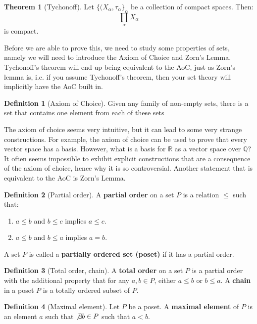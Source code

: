 \documentclass[11pt, oneside]{amsart}   	%
\theoremstyle{definition}
\newtheorem{definition}{Definition}[section]
\newtheorem{theorem}{Theorem}[section]
\begin{document}
	\begin{theorem}[Tychonoff]
		Let $\{(X_\alpha, \tau_\alpha\}_\alpha$ be a collection of compact spaces. Then:
		$$
			\prod_\alpha X_\alpha
		$$
		is compact.
	\end{theorem}
	
	Before we are able to prove this, we need to study some properties of sets, namely we will need to introduce the 
	Axiom of Choice and Zorn's Lemma. Tychonoff's theorem will end up being equivalent to the AoC, just as Zorn's 
	lemma is, i.e. if you assume Tychonoff's theorem, then your set theory will implicitly have the AoC built in. 
	
	\begin{definition}[Axiom of Choice]
		Given any family of non-empty sets, there is a set that contains one element from each of these sets
	\end{definition}
	
	The axiom of choice seems very intuitive, but it can lead to some very strange constructions. For example, the axiom 
	of choice can be used to prove that every vector space has a basis. However, what is a basis for $\mathbb R$ as a 
	vector space over $\mathbb Q$? It often seems impossible to exhibit explicit constructions that are a consequence 
	of the axiom of choice, hence why it is so controversial. Another statement that is equivalent to the AoC is 
	Zorn's Lemma.
	
	\begin{definition}[Partial order]
		A \textbf{partial order} on a set $P$ is a relation $\leq$ such that:
		\begin{enumerate}
			\item $a\leq b$ and $b\leq c$ implies $a\leq c$.
			\item $a\leq b$ and $b\leq a$ implies $a = b$.
		\end{enumerate}
		A set $P$ is called a \textbf{partially ordered set (poset)} if it has a partial order.
	\end{definition}
	
	\begin{definition}[Total order, chain]
		A \textbf{total order} on a set $P$ is a partial order with the additional property that for any $a, b\in P$, either 
		$a\leq b$ or $b\leq a$. A \textbf{chain} in a poset $P$ is a totally ordered subset of $P$. 
	\end{definition}
	
	\begin{definition}[Maximal element]
		Let $P$ be a poset. A \textbf{maximal element} of $P$ is an element $a$ such that $\not\exists b\in P$ such that 
		$a < b$. 
	\end{definition}
	
\end{document}
